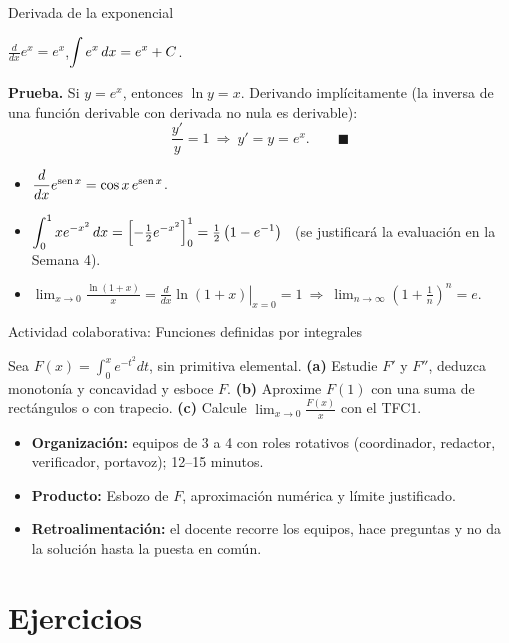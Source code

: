 \documentclass[10pt,aspectratio=169]{beamer}
\begin{document}
\begin{frame}{Derivada de la exponencial}
  \begin{teorema}
    $\displaystyle\frac{d}{dx}e^x=e^x$,\qquad $\displaystyle\int e^x\,dx=e^x+C$.
  \end{teorema}
  \textbf{Prueba.} Si $y=e^x$, entonces $\ln y=x$. Derivando implícitamente (la inversa de una función
  derivable con derivada no nula es derivable):
  \[ \frac{y'}{y}=1\ \Rightarrow\ y'=y=e^x.\qquad\blacksquare \]
  \begin{ejemplo}
    \small
    \begin{itemize}
      \item $\dfrac{d}{dx}e^{\operatorname{sen} x}=\cos x\,e^{\operatorname{sen} x}$.
      \item $\displaystyle\int_0^1xe^{-x^2}\,dx=\left[-\tfrac12e^{-x^2}\right]_0^1=\tfrac12\left(1-e^{-1}\right)$ \ (se justificará la evaluación en la Semana 4).
      \item $\displaystyle\lim_{x\to0}\frac{\ln(1+x)}{x}=\left.\frac{d}{dx}\ln(1+x)\right|_{x=0}=1\ \Rightarrow\ \lim_{n\to\infty}\left(1+\frac1n\right)^n=e$.
    \end{itemize}
  \end{ejemplo}
\end{frame}

\begin{frame}{Actividad colaborativa: Funciones definidas por integrales}
  \small
  \begin{activa}
    Sea $F(x)=\int_0^xe^{-t^2}dt$, sin primitiva elemental. \textbf{(a)} Estudie $F'$ y $F''$, deduzca monotonía y concavidad y esboce $F$. \textbf{(b)} Aproxime $F(1)$ con una suma de rectángulos o con trapecio. \textbf{(c)} Calcule $\lim_{x\to0}\frac{F(x)}x$ con el TFC1.
  \end{activa}
  \begin{itemize}
    \item \textbf{Organización:} equipos de 3 a 4 con roles rotativos (coordinador, redactor, verificador, portavoz); 12--15 minutos.
    \item \textbf{Producto:} Esbozo de $F$, aproximación numérica y límite justificado.
    \item \textbf{Retroalimentación:} el docente recorre los equipos, hace preguntas y no da la solución hasta la puesta en común.
  \end{itemize}
\end{frame}

\section{Ejercicios}
\end{document}
